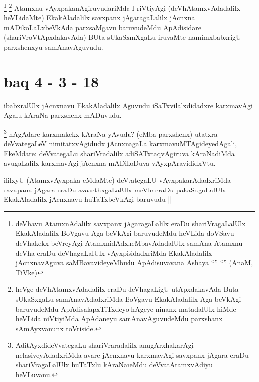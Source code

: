 \begin{artha}
\footnote{deVhavu AtamxnAdalilx savxpanx jAgaragaLalilx eraDu shariVragaLalUlx EkakAladalilx BoVgavu Aga beVkAgi baruvudeMdu heVLida doVSavu deVhakekx beVreyAgi AtamxnidAdxneMbavAdadalUlx samAna Atamxnu deVha eraDu deVhagaLalUlx vAyxpisidadxriMda EkakAladalilx jAcnxnavAguva saMBavavideyeMbudu ApAdisuvavana Ashaya ``\stext'' ``\stext'' (AnaM, TiVke)}
\footnote{heVge deVhAtamxvAdadalilx eraDu deVhagaLigU utApxdakavAda Buta sUkaSxgaLu samAnavAdadxriMda BoVgavu EkakAladalilx Aga beVkAgi baruvudeMdu ApAdisalapxTiTxdeyo hAgeye ninanx matadalUlx hiMde heVLida niVtiyiMda ApAdaneyu samAnavAguvudeMdu parxshanx sAmAyxvanunx toVriside.}
Atamxnu vAyxpakanAgiruvudariMda I riVtiyAgi (deVhAtamxvAdadalilx heVLidaMte) EkakAladalilx savxpanx jAgaragaLalilx jAcnxna mADikoLaLxbeVkAda parxsaMgavu baruvudeMdu ApAdisidare (shariVroVtApxdakavAda) BUta sUkaSxmXgaLu iruvaMte namimxbabxrigU parxshenxyu samAnavAguvudu.
\end{artha}

\section*{baq 4 - 3 - 18}


\begin{artha}
ibabxralUlx jAcnxnavu EkakAladalilx Aguvudu iSaTxvilalxdidadxre karxmavAgi Agalu kAraNa parxshenx mADuvudu.
\end{artha}

\begin{artha}
\footnote{AditAyxdideVvategaLu shariVraradalilx anugArxhakarAgi nelasiveyAdadxriMda avare jAcnxnavu karxmavAgi savxpanx jAgara eraDu shariVragaLalUlx huTaTxlu kAraNareMdu deVvatAtamxvAdiyu heVLuvanu.}
hAgAdare karxmakekx kAraNa yAvudu? (eMba parxshenx) utatxra-deVvategaLeV nimitatxvAgidudx jAcnxnagaLa karxmavuMTAgideyedAgali, EkeMdare: deVvategaLu shariVradalilx adiSATxtaqvAgiruva kAraNadiMda avugaLalilx karxmavAgi jAcnxna mADikoDuva vAyxpAravididxVtu.
\end{artha}


\begin{artha}
ililxyU (AtamxvAyxpaka eMdaMte) deVvategaLU vAyxpakarAdadxriMda savxpanx jAgara eraDu avasethxgaLalUlx meVle eraDu pakaSxgaLalUlx EkakAladalilx jAcnxnavu huTaTxbeVkAgi baruvudu ||
\end{artha}

